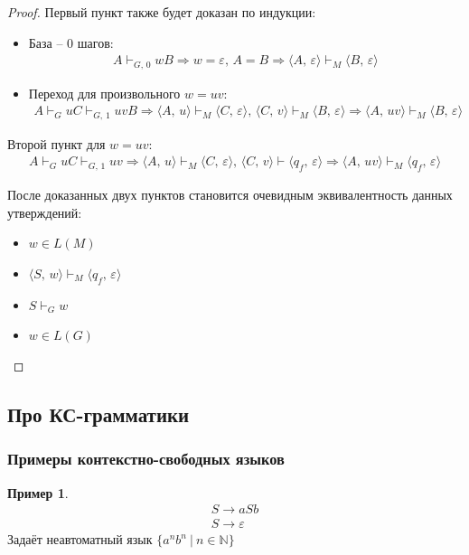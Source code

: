\documentclass[a4paper,12pt]{article}
\theoremstyle{plain}
\theoremstyle{definition}
\newtheorem*{example}{Пример}
\theoremstyle{remark}
\begin{document}
\begin{proof}
	Первый пункт также будет доказан по индукции:
	\begin{itemize}
		\item База -- 0 шагов:
		      \begin{align*}
			      A \vdash_{G,\, 0} wB \Rightarrow w = \varepsilon,\, A = B \Rightarrow \langle A,\, \varepsilon\rangle \vdash_M \langle B,\, \varepsilon\rangle
		      \end{align*}
		\item Переход для произвольного $w = uv$:
		      \begin{align*}
			      A \vdash_G uC \vdash_{G,\,1} uvB \Rightarrow \langle A,\, u\rangle \vdash_M \langle C,\, \varepsilon\rangle,\, \langle C,\, v\rangle \vdash_M \langle B,\, \varepsilon\rangle \Rightarrow \langle A,\, uv\rangle \vdash_M \langle B,\, \varepsilon\rangle
		      \end{align*}
	\end{itemize}
	Второй пункт для $w = uv$:
	\begin{align*}
		A \vdash_G uC \vdash_{G,\,1} uv \Rightarrow \langle A,\, u\rangle \vdash_M \langle C,\, \varepsilon\rangle,\, \langle C,\, v\rangle \vdash \langle q_f,\, \varepsilon\rangle \Rightarrow \langle A,\, uv\rangle \vdash_M \langle q_f,\, \varepsilon\rangle
	\end{align*}

	После доказанных двух пунктов становится очевидным эквивалентность данных утверждений:
	\begin{itemize}
		\item $w \in L(M)$
		\item $\langle S,\, w\rangle \vdash_M \langle q_f,\, \varepsilon\rangle$
		\item $S \vdash_G w$
		\item $w \in L(G)$
	\end{itemize}
\end{proof}

\subsection{Про КС-грамматики}
\subsubsection*{Примеры контекстно-свободных языков}
\begin{example}
	\begin{align*}
		S \to aSb \\
		S \to \varepsilon
	\end{align*}
	Задаёт неавтоматный язык $\{a^nb^n \:|\: n \in \mathbb{N}\}$
\end{example}
\end{document}
